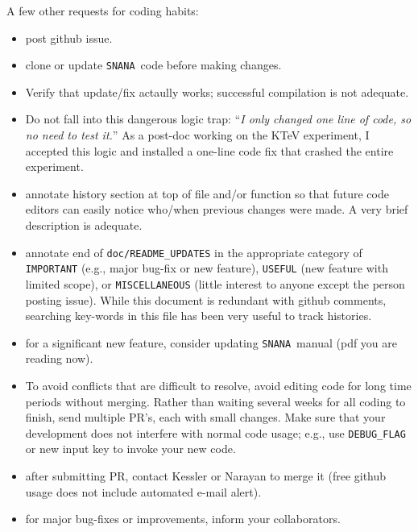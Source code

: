 \documentclass[12pt]{article}
\newcommand{\SNANA}{{\tt SNANA}}
\begin{document}
{A few other requests for coding habits:
\begin{itemize}
   \itemsep0em 
   \item post github issue.
   \item clone or update \SNANA\ code before making changes.
%
   \item Verify that update/fix actaully works;
          successful compilation is not adequate.
%
   \item Do not fall into this dangerous logic trap:
         ``{\it I only changed one line of code, so no need to test it.}'' 
         As a post-doc working on the KTeV experiment, I accepted this 
         logic and installed a one-line code fix that 
         crashed the entire experiment.
%
   \item annotate history section at top of file and/or function so 
         that future code editors can easily notice who/when 
         previous changes were made.
         A very brief description is adequate.
% 
  \item annotate end of {\tt doc/README\_UPDATES} in the appropriate
        category of {\tt IMPORTANT} (e.g., major bug-fix or new feature),
        {\tt USEFUL} (new feature with limited scope), or
        {\tt MISCELLANEOUS} (little interest to anyone
          except the person posting issue).
        While this document is redundant with github comments, 
        searching key-words in this file has been
        very useful to track histories.
% 
   \item for a significant new feature, consider updating \SNANA\ manual
         (pdf you are reading now).
%
   \item To avoid conflicts that are difficult to resolve,
         avoid editing code for long time periods without merging. 
         Rather than waiting several weeks for all coding to finish,
         send multiple PR's, each with small changes.
         Make sure that your development does not
         interfere with normal code usage; 
         e.g., use {\tt DEBUG\_FLAG} or new input key to invoke
         your new code.         
%  
   \item  after submitting PR, contact Kessler or Narayan to merge it
          (free github usage does not include automated e-mail alert).
%
   \item for major bug-fixes or improvements, inform your
         collaborators.
\end{itemize}


   \clearpage
}
\end{document}
